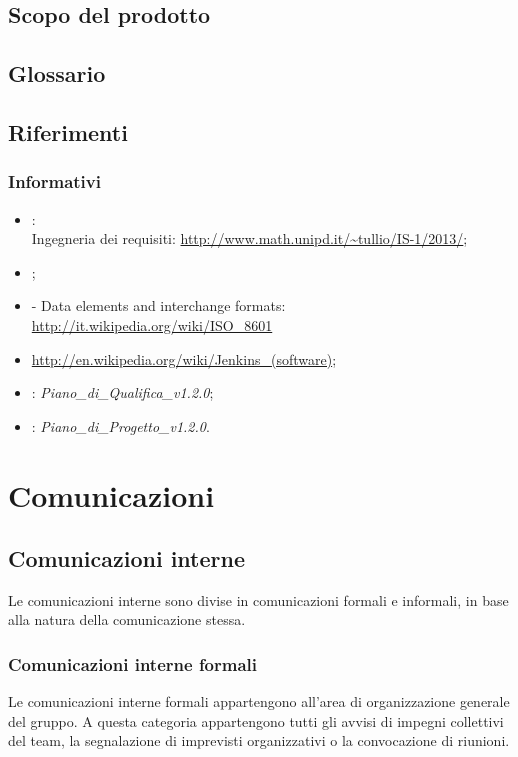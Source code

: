 \subsection{Scopo del prodotto}
\label{1.2}
\Prodotto{}

\subsection{Glossario}%
\label{1.3}
\Glossario{}

\subsection{Riferimenti} %
\label{1.4}
\subsubsection{Informativi}
\begin{itemize}
\item {}:\\
Ingegneria dei requisiti: \url{http://www.math.unipd.it/~tullio/IS-1/2013/};
\item {};\\
\item {} - Data elements and interchange formats: \url{http://it.wikipedia.org/wiki/ISO\_8601}
\item {} \url{http://en.wikipedia.org/wiki/Jenkins_(software)};
\item {}: \emph{Piano\_di\_Qualifica\_v1.2.0};
\item {}: \emph{Piano\_di\_Progetto\_v1.2.0}.
\end{itemize}

\newpage
\section{Comunicazioni}
\label{3.0}

\subsection{Comunicazioni interne}
\label{3.2}
Le comunicazioni interne sono divise in comunicazioni formali e informali, in base alla natura della comunicazione stessa.

\subsubsection{Comunicazioni interne formali}
Le comunicazioni interne formali appartengono all'area di organizzazione generale del gruppo. A questa categoria appartengono tutti gli avvisi di impegni collettivi del team, la segnalazione di imprevisti organizzativi o la convocazione di riunioni.


